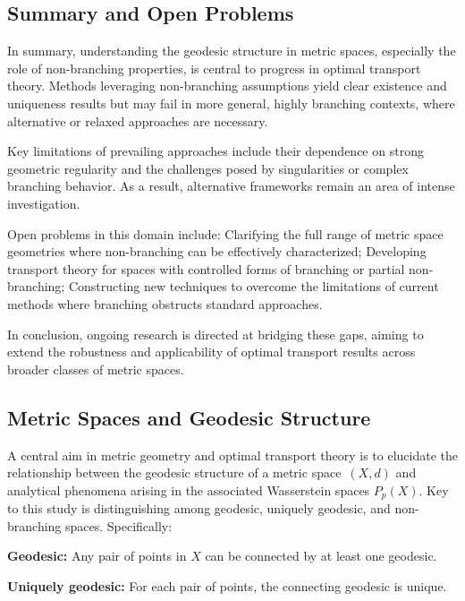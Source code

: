\documentclass[sigconf]{acmart}
\begin{document}

\subsection*{Summary and Open Problems}

In summary, understanding the geodesic structure in metric spaces, especially the role of non-branching properties, is central to progress in optimal transport theory. Methods leveraging non-branching assumptions yield clear existence and uniqueness results but may fail in more general, highly branching contexts, where alternative or relaxed approaches are necessary.

Key limitations of prevailing approaches include their dependence on strong geometric regularity and the challenges posed by singularities or complex branching behavior. As a result, alternative frameworks remain an area of intense investigation.

Open problems in this domain include:
Clarifying the full range of metric space geometries where non-branching can be effectively characterized;
Developing transport theory for spaces with controlled forms of branching or partial non-branching;
Constructing new techniques to overcome the limitations of current methods where branching obstructs standard approaches.

In conclusion, ongoing research is directed at bridging these gaps, aiming to extend the robustness and applicability of optimal transport results across broader classes of metric spaces.

\subsection{Metric Spaces and Geodesic Structure}

A central aim in metric geometry and optimal transport theory is to elucidate the relationship between the geodesic structure of a metric space~$(X, d)$ and analytical phenomena arising in the associated Wasserstein spaces $P_p(X)$. Key to this study is distinguishing among geodesic, uniquely geodesic, and non-branching spaces. Specifically:

\textbf{Geodesic:} Any pair of points in $X$ can be connected by at least one geodesic.

\textbf{Uniquely geodesic:} For each pair of points, the connecting geodesic is unique.
\end{document}
